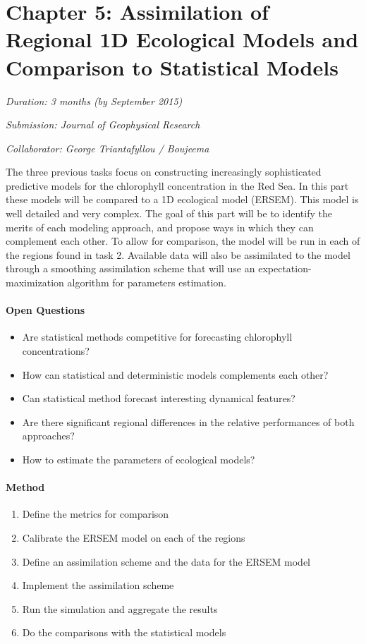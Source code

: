 \section{Chapter 5: Assimilation of Regional 1D Ecological Models and Comparison to Statistical Models}

\noindent
\emph{Duration: 3 months (by September 2015)}

\noindent
\emph{Submission: Journal of Geophysical Research}

\noindent
\emph{Collaborator: George Triantafyllou / Boujeema}

The three previous tasks focus on constructing increasingly sophisticated predictive models for the chlorophyll concentration in the Red Sea. In this part these models will be compared to a 1D ecological model (ERSEM). This model is well detailed and very complex. The goal of this part will be to identify the merits of each modeling approach, and propose ways in which they can complement each other. To allow for comparison, the model will be run in each of the regions found in task 2. Available data will also be assimilated to the model through a smoothing assimilation scheme that will use an expectation-maximization algorithm for parameters estimation. 

\paragraph{Open Questions}

\begin{itemize}
\item Are statistical methods competitive for forecasting chlorophyll concentrations?
\item How can statistical and deterministic models complements each other?
\item Can statistical method forecast interesting dynamical features?
\item Are there significant regional differences in the relative performances of both approaches?
\item How to estimate the parameters of ecological models? 
\end{itemize}

\paragraph{Method}

\begin{enumerate}
\item Define the metrics for comparison
\item Calibrate the ERSEM model on each of the regions
\item Define an assimilation scheme and the data for the ERSEM model
\item Implement the assimilation scheme
\item Run the simulation and aggregate the results
\item Do the comparisons with the statistical models
\end{enumerate}

